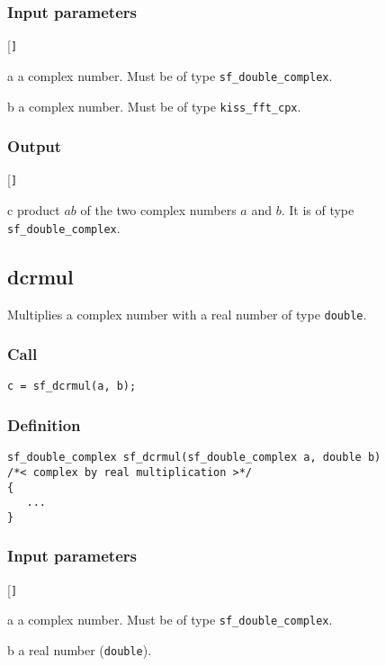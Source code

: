 \subsubsection*{Input parameters}
\begin{desclist}{\tt }{\quad}[\tt ]
   \setlength\itemsep{0pt}
   \item[a] a complex number. Must be of type \texttt{sf\_double\_complex}.  
   \item[b] a complex number. Must be of type \texttt{kiss\_fft\_cpx}.
\end{desclist}

\subsubsection*{Output}
\begin{desclist}{\tt }{\quad}[\tt ]
   \setlength\itemsep{0pt}
   \item[c] product $ab$ of the two complex numbers $a$ and $b$. It is of type \texttt{sf\_double\_complex}.
\end{desclist}



\subsection{{dcrmul}}
Multiplies a complex number with a real number of type \texttt{double}. 

\subsubsection*{Call}
\begin{verbatim}c = sf_dcrmul(a, b);\end{verbatim}

\subsubsection*{Definition}
\begin{verbatim}
sf_double_complex sf_dcrmul(sf_double_complex a, double b)
/*< complex by real multiplication >*/
{
   ...
}
\end{verbatim}

\subsubsection*{Input parameters}
\begin{desclist}{\tt }{\quad}[\tt ]
   \setlength\itemsep{0pt}
   \item[a] a complex number. Must be of type \texttt{sf\_double\_complex}.  
   \item[b] a real number (\texttt{double}).  
\end{desclist}

